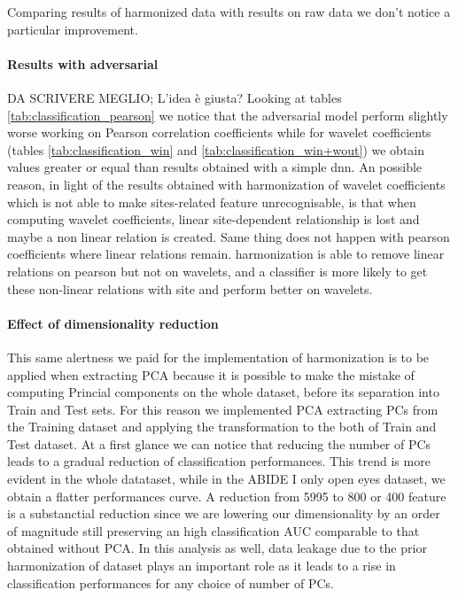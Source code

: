 \documentclass[10pt]{report}
\begin{document}
Comparing results of harmonized data with results on raw data we don't notice a particular improvement.


\paragraph{Results with adversarial}
DA SCRIVERE MEGLIO; L'idea è giusta?
Looking at tables \ref{tab:classification_pearson} we notice that the adversarial model perform slightly worse working on Pearson correlation coefficients while for wavelet coefficients (tables \ref{tab:classification_win} and \ref{tab:classification_win+wout}) we obtain values greater or equal than results obtained with a simple dnn.
An possible reason, in light of the results obtained with harmonization of wavelet coefficients which is not able to make sites-related feature unrecognisable, is that when computing wavelet coefficients, linear site-dependent relationship is lost and maybe a non linear relation is created.
Same thing does not happen with pearson coefficients where linear relations remain. harmonization is able to remove linear relations on pearson but not on wavelets, and a classifier is more likely to get these non-linear relations with site and perform better on wavelets.





\paragraph{Effect of dimensionality reduction}
This same alertness we paid for the implementation of harmonization is to be applied when extracting PCA because it is possible to make the mistake of computing Princial components on the whole dataset, before its separation into Train and Test sets.
For this reason we implemented PCA extracting PCs from the Training dataset and applying the transformation to the both of Train and Test dataset.
At a first glance we can notice that reducing the number of PCs leads to a gradual reduction of classification performances.
This trend is more evident in the whole datataset, while in the ABIDE I only open eyes dataset, we obtain a flatter performances curve.
A reduction from 5995 to 800 or 400 feature is a substanctial reduction since we are lowering our dimensionality by an order of magnitude still preserving an high classification AUC comparable to that obtained without PCA. In this analysis as well, data leakage due to the prior harmonization of dataset plays an important role as it leads to a rise in classification performances for any choice of number of PCs.
\end{document}
